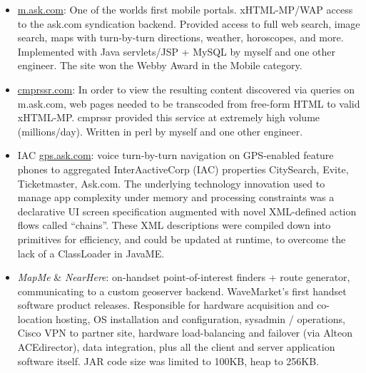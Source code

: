 \begin{itemize}
		\item \url{m.ask.com}: One of the worlds first mobile portals.  xHTML-MP/WAP access to the ask.com
		syndication backend. Provided access to full web search, 
		image search, maps with turn-by-turn directions, weather, horoscopes, and more. 
		Implemented with Java servlets/JSP + MySQL 
		by myself and one other engineer.  The site won the Webby Award in the Mobile category.

		\item \url{cmprssr.com}: In order to view the resulting content discovered via queries on m.ask.com, web 
		pages needed to be transcoded from free-form HTML to valid xHTML-MP. cmprssr provided this service at
		extremely high volume (millions/day). Written in perl by myself and one other engineer.

  		\item IAC \url{gps.ask.com}: voice turn-by-turn navigation on GPS-enabled feature phones
		 to aggregated InterAactiveCorp (IAC) properties CitySearch, Evite, Ticketmaster, Ask.com. The underlying technology innovation
		  used to manage app complexity under memory and processing constraints was a declarative UI screen specification
		   augmented with novel XML-defined action flows called “chains”. These XML descriptions were compiled down
		    into primitives for efficiency, and could be updated at runtime, to overcome the lack of a ClassLoader 
		    in JavaME. 
	   
  		\item {\em MapMe} \& {\em NearHere}:
		on-handset point-of-interest finders + route generator, communicating to a custom geoserver
		backend. WaveMarket’s first handset software product releases. Responsible for hardware acquisition
		and co-location hosting,
		OS installation and configuration, sysadmin / operations, Cisco VPN to partner site, hardware load-balancing
		and failover (via Alteon ACEdirector), data integration, plus all the client and server application software itself.
		JAR code size was limited to 100KB, heap to 256KB.
		
	\end{itemize}


